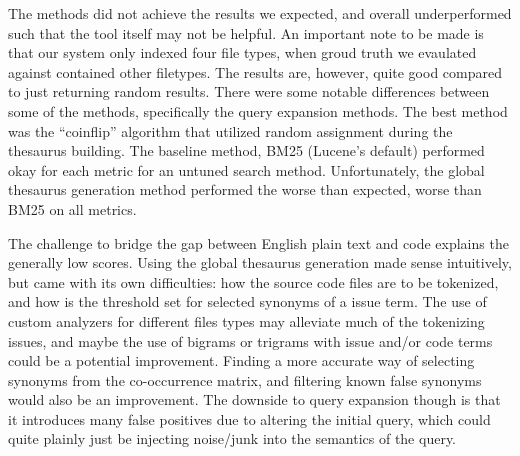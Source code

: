 \documentclass[10pt,a4paper]{article}
\begin{document}
The methods did not achieve the results we expected, and overall underperformed such that the tool itself may not be helpful. An important note to be made is that our system only indexed four file types, when groud truth we evaulated against contained other filetypes. The results are, however, quite good compared to just returning random results. There were some notable differences between some of the methods, specifically the query expansion methods. The best method was the “coinflip” algorithm that utilized random assignment during the thesaurus building. The baseline method, BM25 (Lucene’s default) performed okay for each metric for an untuned search method. Unfortunately, the global thesaurus generation method performed the worse than expected, worse than BM25 on all metrics.

The challenge to bridge the gap between English plain text and code explains the generally low scores. Using the global thesaurus generation made sense intuitively, but came with its own difficulties: how the source code files are to be tokenized, and how is the threshold set for selected synonyms of a issue term. The use of custom analyzers for different files types may alleviate much of the tokenizing issues, and maybe the use of bigrams or trigrams with issue and/or code terms could be a potential improvement. Finding a more accurate way of selecting synonyms from the co-occurrence matrix, and filtering known false synonyms would also be an improvement. The downside to query expansion though is that it introduces many false positives due to altering the initial query, which could quite plainly just be injecting noise/junk into the semantics of the query.
\end{document}
